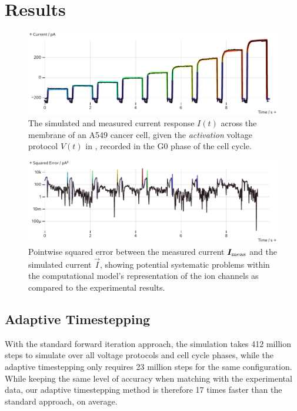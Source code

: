 \documentclass[USenglish,twocolumn]{article}
\begin{document}
  \section{Results}
  \begin{figure}[h]
    \includegraphics[width=\columnwidth]{../figures/results/full-simulation-current.pdf}
    \caption{The simulated and measured current response $I(t)$ across the membrane of an A549 cancer cell, given the \textit{activation} voltage protocol $V(t)$ in , recorded in the G0 phase of the cell cycle.}
    \label{figure:full-simulation-current}
  \end{figure}
  \begin{figure}
    \includegraphics[width=\columnwidth]{../figures/results/simulation-error.pdf}
    \caption{Pointwise squared error between the measured current $\vec{I}_{\rm meas}$ and the simulated current $\vec{I}$, showing potential systematic problems within the computational model's representation of the ion channels as compared to the experimental results.}
    \label{figure:simulation-error}
  \end{figure}

  \subsection{Adaptive Timestepping}
  With the standard forward iteration approach, the simulation takes 412 million steps to simulate over all voltage protocols and cell cycle phases, while the adaptive timestepping only requires 23 million steps for the same configuration.
  While keeping the same level of accuracy when matching with the experimental data, our adaptive timestepping method is therefore 17 times faster than the standard approach, on average.
\end{document}
